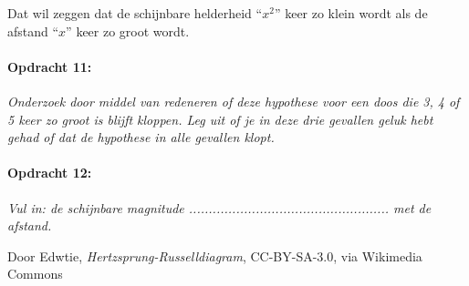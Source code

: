 Dat wil zeggen dat de schijnbare helderheid ``$x^{2}$'' keer zo
klein wordt als de afstand ``$x$'' keer zo groot wordt.


\paragraph*{Opdracht 11: }

\emph{Onderzoek door middel van redeneren of deze hypothese voor een
doos die 3, 4 of 5 keer zo groot is blijft kloppen. Leg uit of je
in deze drie gevallen geluk hebt gehad of dat de hypothese in alle
gevallen klopt.}


\paragraph*{Opdracht 12:}

\emph{Vul in: de schijnbare magnitude ...................................................
met de afstand.}


\begin{thebibliography}{9}
        Door Edwtie, \emph{Hertzsprung-Russelldiagram}, CC-BY-SA-3.0, via Wikimedia Commons
\end{thebibliography}


